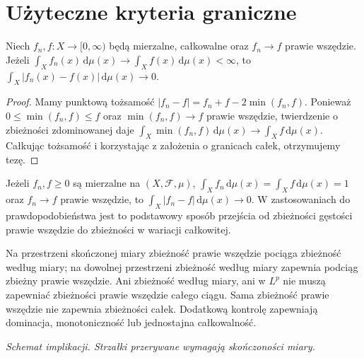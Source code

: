 \section{Użyteczne kryteria graniczne}

\begin{twierdzenie}
\label{thm:scheffe-9}
Niech $f_n,f:X\to[0,\infty)$ będą mierzalne,
całkowalne oraz $f_n\to f$ prawie wszędzie.
Jeżeli
$\int_Xf_n(x)\,\mathrm d\mu(x)\to
\int_Xf(x)\,\mathrm d\mu(x)<\infty$,
to
$\int_X|f_n(x)-f(x)|\,\mathrm d\mu(x)\to0$.
\end{twierdzenie}
\begin{proof}
Mamy punktową tożsamość
$|f_n-f|=f_n+f-2\min(f_n,f)$.
Ponieważ $0\le\min(f_n,f)\le f$ oraz
$\min(f_n,f)\to f$ prawie wszędzie,
twierdzenie o zbieżności zdominowanej daje
$\int_X\min(f_n,f)\,\mathrm d\mu(x)\to\int_Xf\,\mathrm d\mu(x)$.
Całkując tożsamość i korzystając z założenia
o granicach całek, otrzymujemy tezę.
\end{proof}

\begin{wniosek}\label{idx:09:wniosek:14}

Jeżeli $f_n,f\ge0$ są mierzalne na $(X,\mathcal F,\mu)$,
$\int_X f_n\,\mathrm d\mu(x)=
\int_X f\,\mathrm d\mu(x)=1$ oraz $f_n\to f$ prawie
wszędzie, to $\int_X|f_n-f|\,\mathrm d\mu(x)\to0$.
W zastosowaniach do prawdopodobieństwa jest to
podstawowy sposób przejścia od zbieżności gęstości
prawie wszędzie do zbieżności w wariacji całkowitej.
\end{wniosek}

\begin{uwaga}
\label{rem:conv-summary-9}
Na przestrzeni skończonej miary zbieżność prawie
wszędzie pociąga zbieżność według miary; na dowolnej
przestrzeni zbieżność według miary zapewnia podciąg
zbieżny prawie wszędzie. Ani zbieżność według miary,
ani w $L^p$ nie muszą zapewniać zbieżności prawie
wszędzie całego ciągu. Sama zbieżność prawie wszędzie
nie zapewnia zbieżności całek. Dodatkową kontrolę
zapewniają dominacja, monotoniczność lub jednostajna
całkowalność.
\end{uwaga}

\begin{center}
\par\smallskip\textit{Schemat implikacji. Strzałki przerywane wymagają skończoności miary.}
\end{center}
